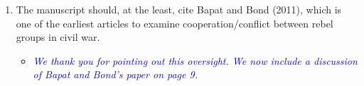 \begin{enumerate}
\begin{itemize}
{{		}}
	\end{itemize}	
	\item The manuscript should, at the least, cite Bapat and Bond (2011), which is one of the earliest articles to examine cooperation/conflict between rebel groups in civil war.
	\begin{itemize}
		\item \textcolor{blue}{ \emph{
		We thank you for pointing out this oversight. We now include a discussion of Bapat and Bond's paper on page \emph{9}.
		}}
	\end{itemize}				
\end{enumerate}
